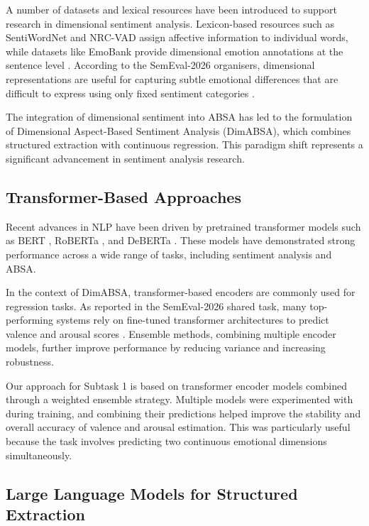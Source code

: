 \documentclass{article}
\begin{document}
A number of datasets and lexical resources have been introduced to support research in dimensional sentiment analysis. Lexicon-based resources such as SentiWordNet \cite{baccianella2010sentiwordnet} and NRC-VAD \cite{mohammad2018nrcvad} assign affective information to individual words, while datasets like EmoBank provide dimensional emotion annotations at the sentence level \cite{buechel2017emobank}. According to the SemEval-2026 organisers, dimensional representations are useful for capturing subtle emotional differences that are difficult to express using only fixed sentiment categories \cite{yu2026dimabsa}.

The integration of dimensional sentiment into ABSA has led to the formulation of Dimensional Aspect-Based Sentiment Analysis (DimABSA), which combines structured extraction with continuous regression. This paradigm shift represents a significant advancement in sentiment analysis research.

\subsection{Transformer-Based Approaches}

Recent advances in NLP have been driven by pretrained transformer models such as BERT \cite{devlin2019bert}, RoBERTa \cite{liu2019roberta}, and DeBERTa \cite{he2021deberta}. These models have demonstrated strong performance across a wide range of tasks, including sentiment analysis and ABSA.

In the context of DimABSA, transformer-based encoders are commonly used for regression tasks. As reported in the SemEval-2026 shared task, many top-performing systems rely on fine-tuned transformer architectures to predict valence and arousal scores \cite{yu2026dimabsa}. Ensemble methods, combining multiple encoder models, further improve performance by reducing variance and increasing robustness.

Our approach for Subtask 1 is based on transformer encoder models combined through a weighted ensemble strategy. Multiple models were experimented with during training, and combining their predictions helped improve the stability and overall accuracy of valence and arousal estimation. This was particularly useful because the task involves predicting two continuous emotional dimensions simultaneously.

\subsection{Large Language Models for Structured Extraction}
\end{document}
